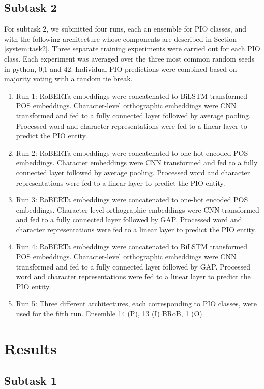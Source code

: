 \documentclass[11pt]{article}
\begin{document}
\subsection{Subtask 2}
\label{exps:task2}
%
For subtask 2, we submitted four runs, each an ensemble for PIO classes, and with the following architecture whose components are described in Section \ref{system:task2}.
Three separate training experiments were carried out for each PIO class.
Each experiment was averaged over the three most common random seeds in python, 0,1 and 42.
Individual PIO predictions were combined based on majority voting with a random tie break.
%
\begin{enumerate}
    \item Run 1: RoBERTa embeddings were concatenated to BiLSTM transformed POS embeddings. Character-level orthographic embeddings were CNN transformed and fed to a fully connected layer followed by average pooling. Processed word and character representations were fed to a linear layer to predict the PIO entity.
    \item Run 2: RoBERTa embeddings were concatenated to one-hot encoded POS embeddings. Character embeddings were CNN transformed and fed to a fully connected layer followed by average pooling. Processed word and character representations were fed to a linear layer to predict the PIO entity.
    \item Run 3: RoBERTa embeddings were concatenated to one-hot encoded POS embeddings. Character-level orthographic embeddings were CNN transformed and fed to a fully connected layer followed by GAP. Processed word and character representations were fed to a linear layer to predict the PIO entity.
    \item Run 4: RoBERTa embeddings were concatenated to BiLSTM transformed POS embeddings. Character-level orthographic embeddings were CNN transformed and fed to a fully connected layer followed by GAP. Processed word and character representations were fed to a linear layer to predict the PIO entity.
    \item Run 5: Three different architectures, each corresponding to PIO classes, were used for the fifth run. Ensemble 14 (P), 13 (I) BRoB, 1 (O)   
\end{enumerate}
%
%
%
\section{Results}

\subsection{Subtask 1}
\end{document}
